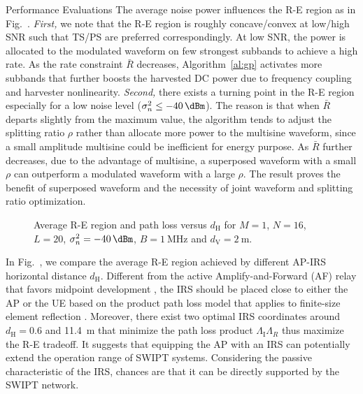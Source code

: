 \documentclass[journal]{IEEEtran}
\begin{document}
\begin{section}{Performance Evaluations}
		The average noise power influences the R-E region as in Fig.~. \emph{First,} we note that the R-E region is roughly concave/convex at low/high SNR such that TS/PS are preferred correspondingly. At low SNR, the power is allocated to the modulated waveform on few strongest subbands to achieve a high rate. As the rate constraint $\bar{R}$ decreases, Algorithm~\ref{al:gp} activates more subbands that further boosts the harvested DC power due to frequency coupling and harvester nonlinearity. \emph{Second,} there exists a turning point in the R-E region especially for a low noise level ($\sigma_n^2 \le \SI{-40}{\dBm}$). The reason is that when $\bar{R}$ departs slightly from the maximum value, the algorithm tends to adjust the splitting ratio $\rho$ rather than allocate more power to the multisine waveform, since a small amplitude multisine could be inefficient for energy purpose. As $\bar{R}$ further decreases, due to the advantage of multisine, a superposed waveform with a small $\rho$ can outperform a modulated waveform with a large $\rho$. The result proves the benefit of superposed waveform and the necessity of joint waveform and splitting ratio optimization.

		\begin{figure}[!t]
			\centering
			\caption{Average R-E region and path loss versus $d_{\mathrm{H}}$ for $M=1$, $N=16$, $L=20$, $\sigma_n^2=\SI{-40}{\dBm}$, $B=\SI{1}{\MHz}$ and $d_{\mathrm{V}}=\SI{2}{\meter}$.}
		\end{figure}

		In Fig.~, we compare the average R-E region achieved by different AP-IRS horizontal distance $d_{\mathrm{H}}$. Different from the active Amplify-and-Forward (AF) relay that favors midpoint development \cite{Li2017}, the IRS should be placed close to either the AP or the UE based on the product path loss model that applies to finite-size element reflection \cite{Ozdogan2020,Tang2021}. Moreover, there exist two optimal IRS coordinates around $d_{\mathrm{H}}=0.6$ and \SI{11.4}{\meter} that minimize the path loss product $\Lambda_{\mathrm{I}}\Lambda_R$ thus maximize the R-E tradeoff. It suggests that equipping the AP with an IRS can potentially extend the operation range of SWIPT systems. Considering the passive characteristic of the IRS, chances are that it can be directly supported by the SWIPT network.


\end{section}
\end{document}
